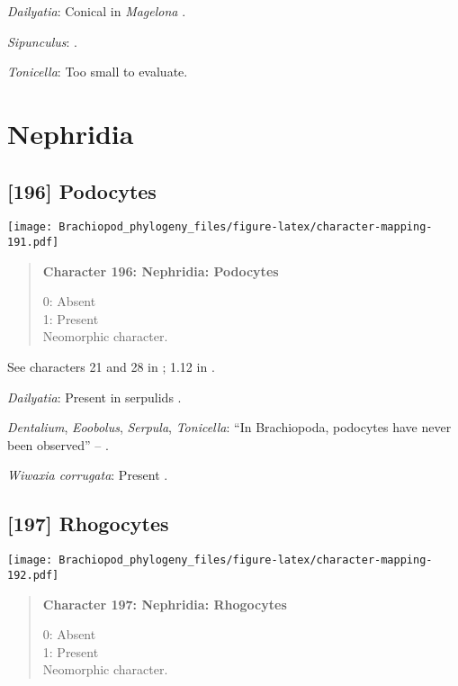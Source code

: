 \documentclass[openany]{book}
\theoremstyle{definition}
\theoremstyle{definition}
\theoremstyle{definition}
\theoremstyle{remark}
\begin{document}
\hypertarget{Dailyatia-coding-195}{}
\emph{Dailyatia}: Conical in \emph{Magelona} \citep{Bartolomaeus1995}.

\hypertarget{Sipunculus-coding-195}{}
\emph{Sipunculus}: \citet{Reed1982}.

\hypertarget{Tonicella-coding-195}{}
\emph{Tonicella}: Too small to evaluate.

\section{Nephridia}\label{nephridia}

\subsection*{{[}196{]} Podocytes}\label{podocytes}

\texttt{[image: Brachiopod\_phylogeny\_files/figure-latex/character-mapping-191.pdf]}

\begin{quote}
\textbf{Character 196: Nephridia: Podocytes}

0: Absent\\
1: Present\\
Neomorphic character.
\end{quote}

See characters 21 and 28 in \citet{Haszprunar2000}; 1.12 in
\citet{Scheltema1993}.

\hypertarget{Dailyatia-coding-196}{}
\emph{Dailyatia}: Present in serpulids \citep{Bartolomaeus2005}.

\hypertarget{Dentalium-coding-196}{}
\emph{Dentalium}, \emph{Eoobolus}, \emph{Serpula}, \emph{Tonicella}:
``In Brachiopoda, podocytes have never been observed'' --
\citet{Luter1995}.

\hypertarget{Wiwaxia_corrugata-coding-196}{}
\emph{Wiwaxia corrugata}: Present \citep{Storch1978}.

\subsection*{{[}197{]} Rhogocytes}\label{rhogocytes}

\texttt{[image: Brachiopod\_phylogeny\_files/figure-latex/character-mapping-192.pdf]}

\begin{quote}
\textbf{Character 197: Nephridia: Rhogocytes}

0: Absent\\
1: Present\\
Neomorphic character.
\end{quote}
\end{document}
